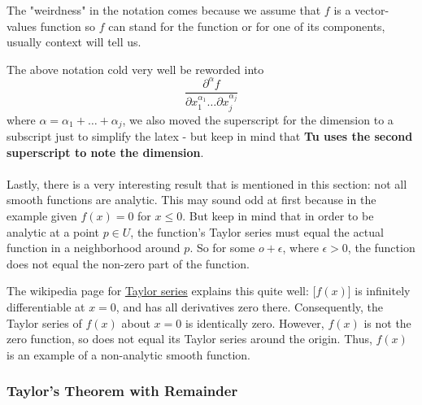 The "weirdness" in the notation comes because we assume that $f$ is a vector-values function so $f$ can stand for the function or
for one of its components, usually context will tell us.

The above notation cold very well be reworded into
$$
\frac{\partial^\alpha f}{\partial x^{\alpha_1}_{1} \ldots \partial x^{\alpha_j}_{j}}
$$
where $\alpha = \alpha_1 + \ldots + \alpha_j$, we also moved the superscript for the dimension to a subscript just
to simplify the latex - but keep in mind that \textbf{Tu uses the second superscript to note the dimension}.
\\~\\



Lastly, there is a very interesting result that is mentioned in this section:
not all smooth functions are analytic.
This may sound odd at first because in the example given $f(x) = 0$ for $x \leq 0$.
But keep in mind that in order to be analytic at a point $p \in U$, the function's Taylor series must equal
the actual function in a neighborhood around $p$.
So for some $o+\epsilon$, where $\epsilon >0$, the function does not equal the non-zero part of the function.

The wikipedia page for \href{https://en.wikipedia.org/wiki/Taylor_series}{Taylor series}
explains this quite well:
[$f(x)$] is infinitely differentiable at $x = 0$, and has all derivatives zero there.
Consequently, the Taylor series of $f(x)$ about $x = 0$ is identically zero.
However, $f(x)$ is not the zero function, so does not equal its Taylor series around the origin.
Thus, $f(x)$ is an example of a non-analytic smooth function.





\subsubsection{Taylor's Theorem with Remainder}